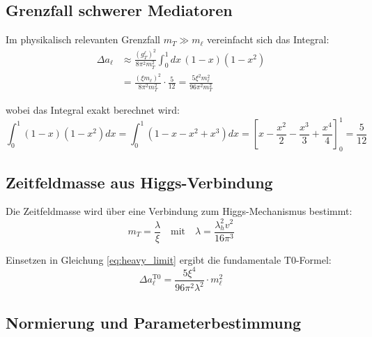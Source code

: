 \documentclass[12pt,a4paper]{article}
\theoremstyle{definition}
\begin{document}
	\subsection{Grenzfall schwerer Mediatoren}
	
	Im physikalisch relevanten Grenzfall $m_T \gg m_\ell$ vereinfacht sich das Integral:
	\begin{align}
		\Delta a_\ell &\approx \frac{(g_T^\ell)^2}{8\pi^2 m_T^2} \int_0^1 dx \, (1-x)(1-x^2) \label{eq:heavy_limit}\\
		&= \frac{(\xi m_\ell)^2}{8\pi^2 m_T^2} \cdot \frac{5}{12} = \frac{5\xi^2 m_\ell^2}{96\pi^2 m_T^2}
	\end{align}
	
	wobei das Integral exakt berechnet wird:
	\[
	\int_0^1 (1-x)(1-x^2) dx = \int_0^1 (1 - x - x^2 + x^3) dx = \left[x - \frac{x^2}{2} - \frac{x^3}{3} + \frac{x^4}{4}\right]_0^1 = \frac{5}{12}
	\]
	
	\subsection{Zeitfeldmasse aus Higgs-Verbindung}
	
	Die Zeitfeldmasse wird über eine Verbindung zum Higgs-Mechanismus bestimmt\cite{pascher_higgs_connection_2025}:
	\begin{equation}
		m_T = \frac{\lambda}{\xi} \quad \text{mit} \quad \lambda = \frac{\lambda_h^2 v^2}{16\pi^3}
		\label{eq:higgs_connection}
	\end{equation}
	
	Einsetzen in Gleichung \eqref{eq:heavy_limit} ergibt die fundamentale T0-Formel:
	\begin{equation}
		\Delta a_\ell^{\text{T0}} = \frac{5\xi^4}{96\pi^2\lambda^2} \cdot m_\ell^2
		\label{eq:t0_fundamental_formula}
	\end{equation}
	
	\subsection{Normierung und Parameterbestimmung}
	
\end{document}
